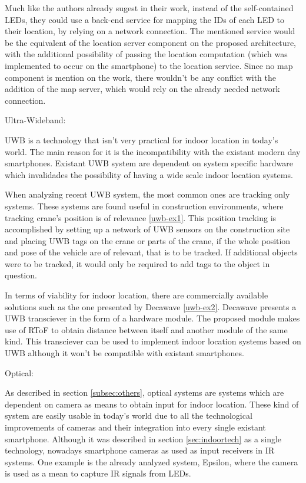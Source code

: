 	Much like the authors already sugest in their work, instead of the self-contained LEDs, they could use a back-end service for mapping the IDs of each LED to their location, by relying on a network connection. The mentioned service would be the equivalent of the location server component on the proposed architecture, with the additional possibility of passing the location computation (which was implemented to occur on the smartphone) to the location service. Since no map component is mention on the work, there wouldn't be any conflict with the addition of the map server, which would rely on the already needed network connection.


Ultra-Wideband:

	\acf{UWB} is a technology that isn't very practical for indoor location in today's world. The main reason for it is the incompatibility with the existant modern day smartphones.
	Existant \ac{UWB} system are dependent on system specific hardware which invalidades the possibility of having a wide scale indoor location systems.

	When analyzing recent \ac{UWB} system, the most common ones are tracking only systems. These systems are found useful in construction environments, where tracking crane's position is of relevance \ref{uwb-ex1}. This position tracking is accomplished by setting up a network of \ac{UWB} sensors on the construction site and placing \ac{UWB} tags on the crane or parts of the crane, if the whole position and pose of the vehicle are of relevant, that is to be tracked. If additional objects were to be tracked, it would only be required to add tags to the object in question.

	In terms of viability for indoor location, there are commercially available solutions such as the one presented by Decawave \ref{uwb-ex2}. Decawave presents a \ac{UWB} transciever in the form of a hardware module. The proposed module makes use of \acf{RToF} to obtain distance between itself and another module of the same kind. This transciever can be used to implement indoor location systems based on \ac{UWB} although it won't be compatible with existant smartphones.


Optical:

	As described in section \ref{subsec:others}, optical systems are systems which are dependent on camera as means to obtain input for indoor location. These kind of system are easily usable in today's world due to all the technological improvements of cameras and their integration into every single existant smartphone. Although it was described in section \ref{sec:indoortech} as a single technology, nowadays smartphone cameras as used as input receivers in \ac{IR} systems. One example is the already analyzed system, Epsilon, where the camera is used as a mean to capture \ac{IR} signals from LEDs. 

